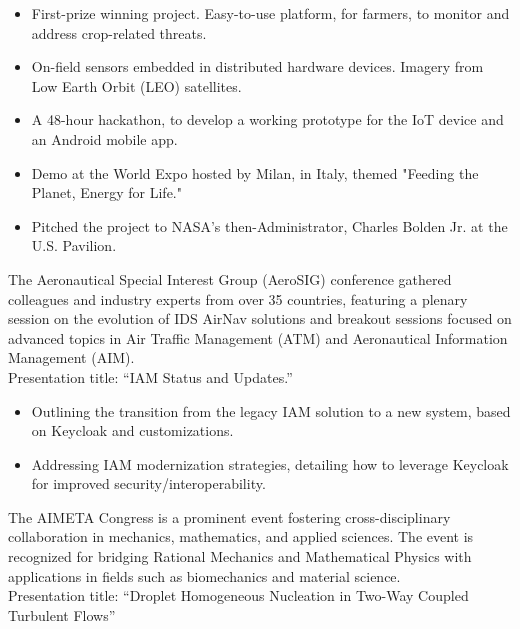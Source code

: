 \divider

\begin{itemize}
	\item First-prize winning project. Easy-to-use platform, for farmers, to monitor and address crop-related threats.
	\item On-field sensors embedded in distributed hardware devices. Imagery from Low Earth Orbit (LEO) satellites.
	\item A 48-hour hackathon, to develop a working prototype for the IoT device and an Android mobile app.
	\item Demo at the World Expo hosted by Milan, in Italy, themed "Feeding the Planet, Energy for Life."
	\item Pitched the project to NASA’s then-Administrator, Charles Bolden Jr. at the U.S. Pavilion.
\end{itemize}

\iflongversion
	The Aeronautical Special Interest Group (AeroSIG) conference gathered colleagues and industry experts from over 35 countries, featuring a plenary session on the evolution of IDS AirNav solutions and breakout sessions focused on advanced topics in Air Traffic Management (ATM) and Aeronautical Information Management (AIM). \\
	\medskip
	Presentation title: ``IAM Status and Updates.'' \\
	\smallskip
	\begin{itemize}
		\item Outlining the transition from the legacy IAM solution to a new system, based on Keycloak and customizations.
		\item Addressing IAM modernization strategies, detailing how to leverage Keycloak for improved security/interoperability.
	\end{itemize}

	\divider

	The AIMETA Congress is a prominent event fostering cross-disciplinary collaboration in mechanics, mathematics, and applied sciences. The event is recognized for bridging Rational Mechanics and Mathematical Physics with applications in fields such as biomechanics and material science. \\
	\medskip
	Presentation title: ``Droplet Homogeneous Nucleation in Two-Way Coupled Turbulent Flows''


